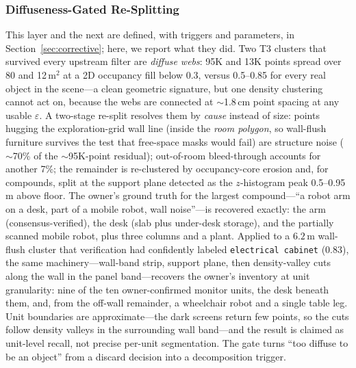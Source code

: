 \documentclass[electronics,article,accept,pdftex,moreauthors]{Definitions/mdpi}
\begin{document}
\subsubsection{Diffuseness-Gated Re-Splitting}
This layer and the next are defined, with triggers and parameters, in
Section~\ref{sec:corrective}; here, we report what they did.
Two T3 clusters that survived every upstream filter are \emph{diffuse
webs}: 95K and 13K points spread over 80 and 12\,m$^2$ at a 2D occupancy
fill below 0.3, versus 0.5--0.85 for every real object in the scene---a clean geometric signature, but one density clustering cannot act on,
because the webs are connected at $\sim$1.8\,cm point spacing at any
usable $\varepsilon$. A two-stage re-split resolves them by \emph{cause}
instead of size: points hugging the exploration-grid wall line (inside
the \emph{room polygon}, so wall-flush furniture survives the test that
free-space masks would fail) are structure noise ($\sim$70\% of the
$\sim$95K-point residual); out-of-room bleed-through accounts for another
7\%; the remainder is re-clustered by occupancy-core erosion and, for
compounds, split at the support plane detected as the $z$-histogram
peak 0.5--0.95\,m above floor. The owner's ground truth for the largest
compound---``a robot arm on a desk, part of a mobile robot, wall
noise''---is recovered exactly: the arm (consensus-verified), the
desk (slab plus under-desk storage), and the partially scanned mobile
robot, plus three columns and a plant. Applied to a $6.2$\,m
wall-flush cluster that verification had confidently labeled
\texttt{electrical cabinet} (0.83), the same machinery---wall-band
strip, support plane, then density-valley cuts along the wall in the
panel band---recovers the owner's inventory at unit granularity:
nine of the ten owner-confirmed monitor units, the desk beneath them,
and, from the off-wall remainder, a wheelchair robot and a single
table leg. Unit boundaries are approximate---the dark screens return
few points, so the cuts follow density valleys in the surrounding wall
band---and the result is claimed as unit-level recall, not precise
per-unit segmentation. The gate turns ``too diffuse to be an object''
from a discard decision into a decomposition trigger.
\end{document}
